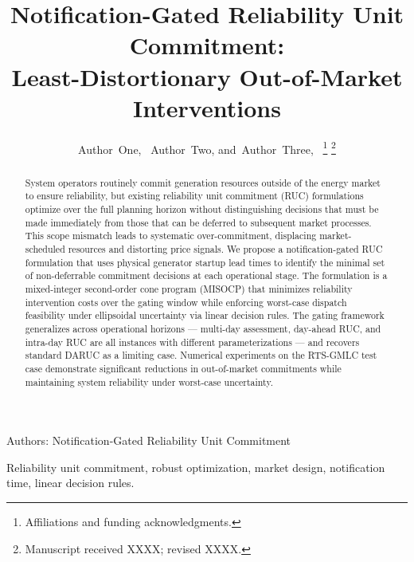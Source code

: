 \documentclass[journal]{IEEEtran}
\begin{document}
\title{Notification-Gated Reliability Unit Commitment:\\ Least-Distortionary Out-of-Market Interventions}

\author{Author~One,~
        Author~Two,
        and~Author~Three,~%
\thanks{Affiliations and funding acknowledgments.}%
\thanks{Manuscript received XXXX; revised XXXX.}}

%
{Authors: Notification-Gated Reliability Unit Commitment}

\maketitle

\begin{abstract}
System operators routinely commit generation resources outside of the
energy market to ensure reliability, but existing reliability unit
commitment (RUC) formulations optimize over the full planning horizon
without distinguishing decisions that must be made immediately from
those that can be deferred to subsequent market processes.
This scope mismatch leads to systematic over-commitment, displacing
market-scheduled resources and distorting price signals.
We propose a notification-gated RUC formulation that uses physical
generator startup lead times to identify the minimal set of
non-deferrable commitment decisions at each operational stage.
The formulation is a mixed-integer second-order cone program (MISOCP)
that minimizes reliability intervention costs over the gating window
while enforcing worst-case dispatch feasibility under ellipsoidal
uncertainty via linear decision rules.
The gating framework generalizes across operational horizons ---
multi-day assessment, day-ahead RUC, and intra-day RUC are all
instances with different parameterizations --- and recovers standard
DARUC as a limiting case.
Numerical experiments on the RTS-GMLC test case demonstrate
significant reductions in out-of-market commitments while maintaining
system reliability under worst-case uncertainty.
\end{abstract}

\begin{IEEEkeywords}
Reliability unit commitment, robust optimization, market design,
notification time, linear decision rules.
\end{IEEEkeywords}

\IEEEpeerreviewmaketitle
\end{document}
